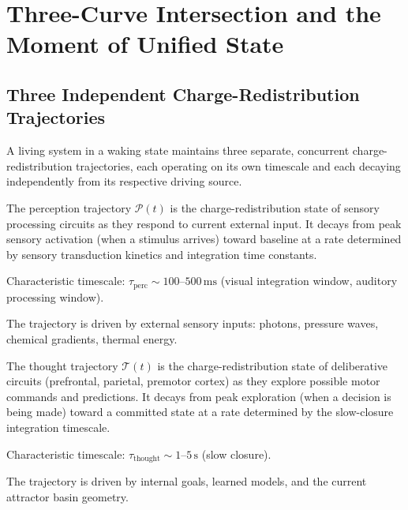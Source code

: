 \section{Three-Curve Intersection and the Moment of Unified State}
\label{sec:curve-intersection}

\subsection{Three Independent Charge-Redistribution Trajectories}

A living system in a waking state maintains three separate, concurrent charge-redistribution trajectories, each operating on its own timescale and each decaying independently from its respective driving source.

\begin{definition}
\label{def:perception-traj}
The perception trajectory $\mathcal{P}(t)$ is the charge-redistribution state of sensory processing circuits as they respond to current external input. It decays from peak sensory activation (when a stimulus arrives) toward baseline at a rate determined by sensory transduction kinetics and integration time constants.

Characteristic timescale: $\tau_{\text{perc}} \sim 100\text{--}500\,\text{ms}$ (visual integration window, auditory processing window).

The trajectory is driven by external sensory inputs: photons, pressure waves, chemical gradients, thermal energy.
\end{definition}

\begin{definition}
\label{def:thought-traj}
The thought trajectory $\mathcal{T}(t)$ is the charge-redistribution state of deliberative circuits (prefrontal, parietal, premotor cortex) as they explore possible motor commands and predictions. It decays from peak exploration (when a decision is being made) toward a committed state at a rate determined by the slow-closure integration timescale.

Characteristic timescale: $\tau_{\text{thought}} \sim 1\text{--}5\,\text{s}$ (slow closure).

The trajectory is driven by internal goals, learned models, and the current attractor basin geometry.
\end{definition}

